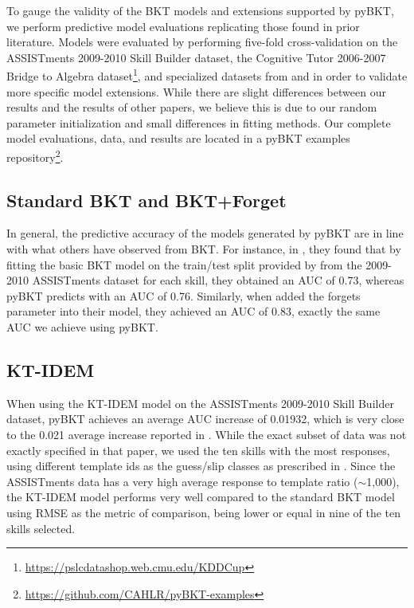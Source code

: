 \documentclass{edm_article}
\begin{document}
To gauge the validity of the BKT models and extensions supported by pyBKT, we perform predictive model evaluations replicating those found in prior literature. Models were evaluated by performing five-fold cross-validation on the ASSISTments 2009-2010 Skill Builder dataset, the Cognitive Tutor 2006-2007 Bridge to Algebra dataset\footnote{\url{https://pslcdatashop.web.cmu.edu/KDDCup}}, and specialized datasets from \citet{feng2008can} and \citet{piech2015deep} in order to validate more specific model extensions. While there are slight differences between our results and the results of other papers, we believe this is due to our random parameter initialization and small differences in fitting methods. Our complete model evaluations, data, and results are located in a pyBKT examples repository\footnote{\url{https://github.com/CAHLR/pyBKT-examples}}.

\subsection{Standard BKT and BKT+Forget}
In general, the predictive accuracy of the models generated by pyBKT are in line with what others have observed from BKT. For instance, in \citet{khajah2016deep}, they found that by fitting the basic BKT model on the train/test split provided by \citet{piech2015deep} from the 2009-2010 ASSISTments dataset for each skill, they obtained an AUC of 0.73, whereas pyBKT predicts with an AUC of 0.76. Similarly, when \citet{khajah2016deep} added the forgets parameter into their model, they achieved an AUC of 0.83, exactly the same AUC we achieve using pyBKT.

\subsection{KT-IDEM}
When using the KT-IDEM model on the ASSISTments 2009-2010 Skill Builder dataset, pyBKT achieves an average AUC increase of 0.01932, which is very close to the 0.021 average increase reported in \citet{pardos2011kt}. While the exact subset of data was not exactly specified in that paper, we used the ten skills with the most responses, using different template ids as the guess/slip classes as prescribed in \cite{pardos2011kt}. Since the ASSISTments data has a very high average response to template ratio ($\sim$1,000), the KT-IDEM model performs very well compared to the standard BKT model using RMSE as the metric of comparison, being lower or equal in nine of the ten skills selected. 
\end{document}
